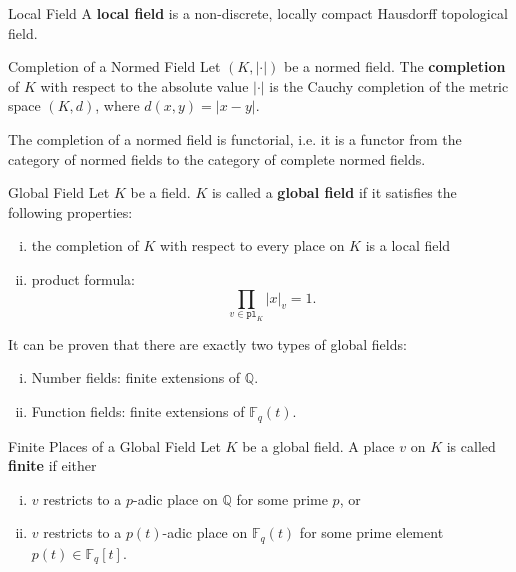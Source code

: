 \begin{definition}{Local Field}{}
    A \textbf{local field} is a non-discrete, locally compact Hausdorff topological field.
\end{definition}


\begin{definition}{Completion of a Normed Field}{}
    Let \( (K, |\cdot|) \) be a normed field. The \textbf{completion} of \( K \) with respect to the absolute value \( |\cdot| \) is the Cauchy completion of the metric space \( (K, d) \), where \( d(x, y) = |x - y| \).
\end{definition}

The completion of a normed field is functorial, i.e. it is a functor from the category of normed fields to the category of complete normed fields.

\begin{definition}{Global Field}{}
    Let $K$ be a field. $K$ is called a \textbf{global field} if it satisfies the following properties:
    \begin{enumerate}[(i)]
        \item the completion of $K$ with respect to every place on $K$ is a local field
        \item product formula:
        \[
        \prod_{v\in \mathtt{pl}_K} |x|_v = 1.
        \]
    \end{enumerate}
    It can be proven that there are exactly two types of global fields:

\begin{enumerate}[(i)]
    \item Number fields: finite extensions of $\mathbb{Q}$.
    \item Function fields: finite extensions of $\mathbb{F}_q(t)$.
\end{enumerate}   
\end{definition}

\begin{definition}{Finite Places of a Global Field}{}
    Let $K$ be a global field. A place $v$ on $K$ is called \textbf{finite} if either 
    \begin{enumerate}[(i)]
        \item $v$ restricts to a $p$-adic place on $\mathbb{Q}$ for some prime $p$, or
        \item $v$ restricts to a $p(t)$-adic place on $\mathbb{F}_q(t)$ for some prime element $p(t) \in \mathbb{F}_q[t]$.
    \end{enumerate}
\end{definition}





